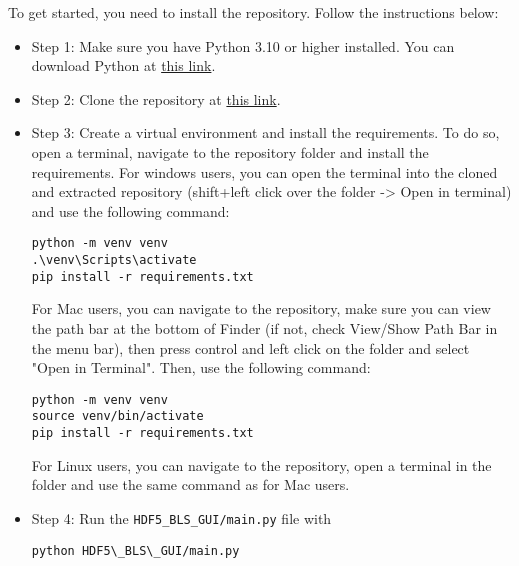 To get started, you need to install the repository. Follow the instructions below:

\begin{itemize}
    \item Step 1: Make sure you have Python 3.10 or higher installed. You can download Python at \href{https://www.python.org/downloads/}{this link}.
    \item Step 2: Clone the repository at \href{https://github.com/bio-brillouin/HDF5_BLS/tree/main}{this link}.    
    \item Step 3: Create a virtual environment and install the requirements. To do so, open a terminal, navigate to the repository folder and install the requirements. For windows users, you can open the terminal into the cloned and extracted repository (shift+left click over the folder -> Open in terminal) and use the following command:
\begin{lstlisting}
python -m venv venv
.\venv\Scripts\activate
pip install -r requirements.txt
\end{lstlisting}
    For Mac users, you can navigate to the repository, make sure you can view the path bar at the bottom of Finder (if not, check View/Show Path Bar in the menu bar), then press control and left click on the folder and select "Open in Terminal". Then, use the following command:
\begin{lstlisting}
python -m venv venv
source venv/bin/activate
pip install -r requirements.txt
\end{lstlisting}
    For Linux users, you can navigate to the repository, open a terminal in the folder and use the same command as for Mac users.
    \item Step 4: Run the \texttt{HDF5\_BLS\_GUI/main.py} file with
\begin{lstlisting}
python HDF5\_BLS\_GUI/main.py
\end{lstlisting}
\end{itemize}